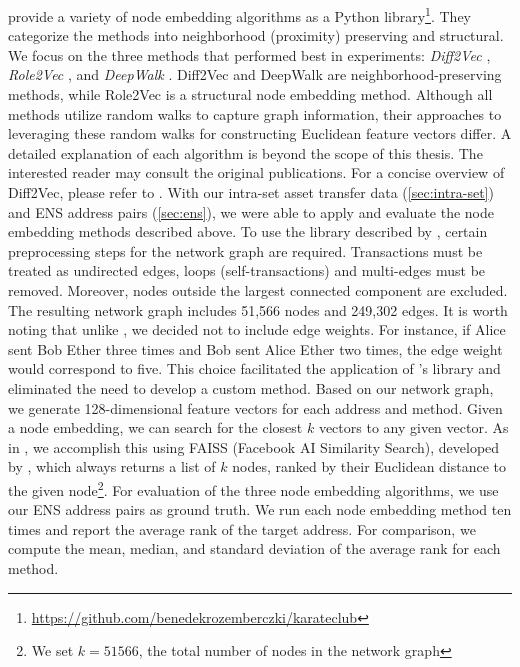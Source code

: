 \documentclass[12pt,a4paper,titlepage,oneside,english]{article}
\begin{document}
\cite{karateclub} provide a variety of node embedding algorithms as a Python library\footnote{\url{https://github.com/benedekrozemberczki/karateclub}}. They categorize the methods into neighborhood (proximity) preserving and structural. \newline
We focus on the three methods that performed best in \cite{Beres2020} experiments: \textit{Diff2Vec} \citep{rozemberczki2020difftovec}, \textit{Role2Vec} \citep{ahmed2018roletovec}, and \textit{DeepWalk} \citep{perozzi2014}. Diff2Vec and DeepWalk are neighborhood-preserving methods, while Role2Vec is a structural node embedding method. Although all methods utilize random walks to capture graph information, their approaches to leveraging these random walks for constructing Euclidean feature vectors differ. A detailed explanation of each algorithm is beyond the scope of this thesis. The interested reader may consult the original publications. For a concise overview of Diff2Vec, please refer to \cite{wu2022tutela}. \newline
With our intra-set asset transfer data (\ref{sec:intra-set}) and ENS address pairs (\ref{sec:ens}), we were able to apply and evaluate the node embedding methods described above. To use the library described by \cite{karateclub}, certain preprocessing steps for the network graph are required. Transactions must be treated as undirected edges, loops (self-transactions) and multi-edges must be removed. Moreover, nodes outside the largest connected component are excluded. The resulting network graph includes 51,566 nodes and 249,302 edges. \newline
It is worth noting that unlike \cite{wu2022tutela}, we decided not to include edge weights. For instance, if Alice sent Bob Ether three times and Bob sent Alice Ether two times, the edge weight would correspond to five. This choice facilitated the application of \cite{rozemberczki2020difftovec}'s library and eliminated the need to develop a custom method. Based on our network graph, we generate 128-dimensional feature vectors for each address and method. \newline
Given a node embedding, we can search for the closest $k$ vectors to any given vector. As in \cite{wu2022tutela}, we accomplish this using FAISS (Facebook AI Similarity Search), developed by \cite{johnson2019faiss}, which always returns a list of $k$ nodes, ranked by their Euclidean distance to the given node\footnote{We set $k = 51566$, the total number of nodes in the network graph}. \newline
For evaluation of the three node embedding algorithms, we use our ENS address pairs as ground truth. We run each node embedding method ten times and report the average rank of the target address. For comparison, we compute the mean, median, and standard deviation of the average rank for each method.
\end{document}
